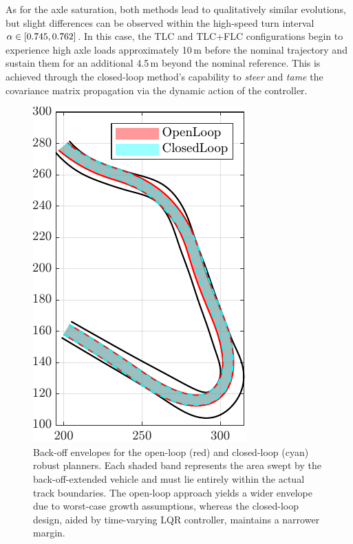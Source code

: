 As for the axle saturation, both methods lead to qualitatively similar evolutions, but slight differences can be observed within the high-speed turn interval $\alpha \in [0.745, 0.762]$. In this case, the TLC and TLC+FLC configurations begin to experience high axle loads approximately 10\,m before the nominal trajectory and sustain them for an additional 4.5\,m beyond the nominal reference. This is achieved through the closed-loop method's capability to \emph{steer} and \emph{tame} the covariance matrix propagation via the dynamic action of the controller.

\begin{figure}[b!]
	\centering
	\includegraphics{Fig/olcl_traj_bands.pdf}
	\caption{Back-off envelopes for the open-loop (red) and closed-loop (cyan) robust planners. Each shaded band represents the area swept by the back-off-extended vehicle and must lie entirely within the actual track boundaries.
		The open-loop approach yields a wider envelope due to worst-case growth assumptions, whereas the closed-loop design, aided by time-varying LQR controller, maintains a narrower margin.}
	\label{fig:olcl_traj_bands}
\end{figure}

